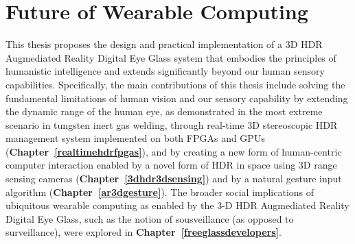 \chapter{Future of Wearable Computing}




This thesis proposes the design and practical implementation of a 3D HDR Augmediated Reality Digital Eye Glass system that embodies the principles of humanistic intelligence and extends significantly beyond our human sensory capabilities.  Specifically, the main contributions of this thesis include solving the fundamental limitations of human vision and our sensory capability by extending the dynamic range of the human eye, as demonstrated in the most extreme scenario in tungsten inert gas welding, through real-time 3D stereoscopic HDR management system implemented on both FPGAs and GPUs (\textbf{Chapter~\ref{realtimehdrfpgas}}), and by creating a new form of human-centric computer interaction enabled by a novel form of HDR in space using 3D range sensing cameras (\textbf{Chapter~\ref{3dhdr3dsensing}}) and by a natural gesture input algorithm (\textbf{Chapter~\ref{ar3dgesture}}).  The broader social implications of ubiquitous wearable computing as enabled by the 3-D HDR Augmediated Reality Digital Eye Glass, such as the notion of sousveillance (as opposed to surveillance), were explored in \textbf{Chapter~\ref{freeglassdevelopers}}. 

